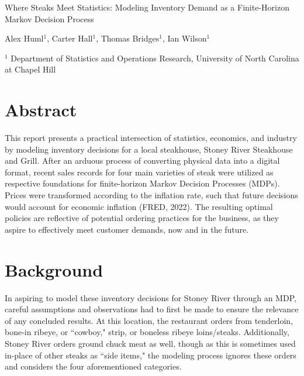 \documentclass[12pt,a4paper]{article}
\begin{document}
\Large
\begin{center}
Where Steaks Meet Statistics: Modeling Inventory Demand as a Finite-Horizon Markov Decision Process
\hspace{20pt}

\large
Alex Huml$^1$, Carter Hall$^1$, Thomas Bridges$^1$, Ian Wilson$^1$\\

\hspace{10pt}

\small  
$^1$ Department of Statistics and Operations Research, University of North Carolina at Chapel Hill\\

\end{center}

\hrulefill
\normalsize

\section{Abstract}

This report presents a practical intersection of statistics, economics, and industry by modeling inventory decisions for a local steakhouse, Stoney River Steakhouse and Grill. After an arduous process of converting physical data into a digital format, recent sales records for four main varieties of steak were utilized as respective foundations for finite-horizon Markov Decision Processes (MDPs). Prices were transformed according to the inflation rate, such that future decisions would account for economic inflation (FRED, 2022). The resulting optimal policies are reflective of potential ordering practices for the business, as they aspire to effectively meet customer demands, now and in the future.

\section{Background}

In aspiring to model these inventory decisions for Stoney River through an MDP, careful assumptions and observations had to first be made to ensure the relevance of any concluded results. At this location, the restaurant orders from tenderloin, bone-in ribeye, or ``cowboy," strip, or boneless ribeye loins/steaks. Additionally, Stoney River orders ground chuck meat as well, though as this is sometimes used in-place of other steaks as ``side items," the modeling process ignores these orders and considers the four aforementioned categories.
\\
\end{document}
